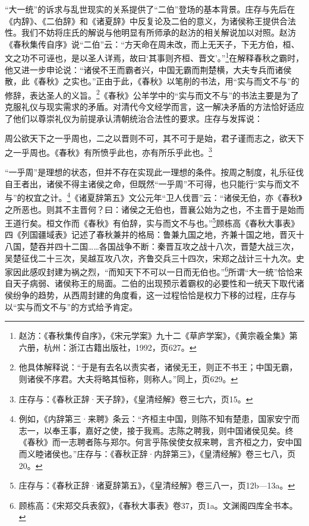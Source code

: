\documentclass[a4paper, 12pt, openright]{ctexbook}
\renewenvironment{quote}
  {\list{}{\rightmargin2\ccwd \leftmargin2\ccwd \itemindent=2\ccwd \listparindent=2\ccwd}%
   \item\relax\small\kaishu\color{black}}
  {\endlist}
\begin{document}
“大一统”的诉求与乱世现实的关系提供了“二伯”登场的基本背景。庄存与先后在《内辞》、《二伯辞》和《诸夏辞》中反复论及二伯的意义，为诸侯称王提供合法性。我们不妨将庄氏的解说与他明显有所师承的赵汸的相关解说加以对照。赵汸《春秋集传自序》说“二伯”云：“方天命在周未改，而上无天子，下无方伯，桓、文之功不可诬也，是以圣人详焉，故曰‘其事则齐桓、晋文’。”\footnote{赵汸：《春秋集传自序》，《宋元学案》九十二《草庐学案》，《黄宗羲全集》第六册，杭州：浙江古籍出版社，1992，页627。}在解释春秋之霸时，他又进一步申论说：“诸侯不王而霸者兴，中国无霸而荆楚横，大夫专兵而诸侯散，此《春秋》之实也。”正由于此，《春秋》以笔削的书法，用“实与而文不与”的修辞，表达圣人的义旨。\footnote{他具体解释说：“于是有去名以责实者，诸侯无王，则正不书王；中国无霸，则诸侯不序君。大夫将略其恒称，则称人。”同上，页629。}《春秋》公羊学中的“实与而文不与”的书法主要是为了克服礼仪与现实需求的矛盾。对清代今文经学而言，这一解决矛盾的方法恰好适应了他们以尊崇礼仪为前提承认清朝统治合法性的要求。庄存与发挥说：

\begin{quote}
周公欲天下之一乎周也，二之以晋则不可，其不可于是始，君子谨而志之，欲天下之一乎周也。《春秋》有所愤乎此也，亦有所乐乎此也。\footnote{庄存与：《春秋正辞·天子辞》，《皇清经解》卷三七六，页15。}
\end{quote}

“一乎周”是理想的状态，但并不存在实现此一理想的条件。按周之制度，礼乐征伐自王者出，诸侯不得主诸侯之命，但既然“一乎周”不可得，也只能行“实与而文不与”的权宜之计。\footnote{例如，《内辞第三·来聘》条云：“齐桓主中国，则陈不知有楚患，国家安宁而志一，以奉王事，嘉好之使，接于我焉。志陈之聘我，则中国诸侯见矣。终《春秋》而一志聘者陈与郑尔。何言乎陈侯使女叔来聘，言齐桓之力，安中国而义睦诸侯也。”庄存与：《春秋正辞·内辞第三》，《皇清经解》卷三七八，页20。}《诸夏辞第五》文公元年“卫人伐晋”云：“诸侯无伯，亦《春秋》之所恶也。则其不主晋何？曰：诸侯之无伯也，晋襄公始为之也，不主晋于是始而王道行矣。桓文作而《春秋》有伯辞，实与而文不与也。”\footnote{庄存与：《春秋正辞·诸夏辞第五》，《皇清经解》卷三八一，页12b—13a。}顾栋高《春秋大事表》四《列国疆域表》记述了春秋兼并的格局：鲁兼九国之地，齐兼十国之地，晋灭十八国，楚吞并四十二国……各国战争不断：秦晋互攻之战十八次，晋楚大战三次，吴楚征伐二十三次，吴越互攻八次，齐鲁交兵三十四次，宋郑之战计三十九次。史家因此感叹封建为祸之烈，“而知天下不可以一日而无伯也。”\footnote{顾栋高：《宋郑交兵表叙》，《春秋大事表》卷37，页1a。文渊阁四库全书本。}所谓“大一统”恰恰来自天子病弱、诸侯称王的局面。二伯的出现预示着霸权的必要性和一统天下取代诸侯纷争的趋势，从西周封建的角度看，这一过程恰恰是权力下移的过程，庄存与以“实与而文不与”的方式给予肯定。
\end{document}
